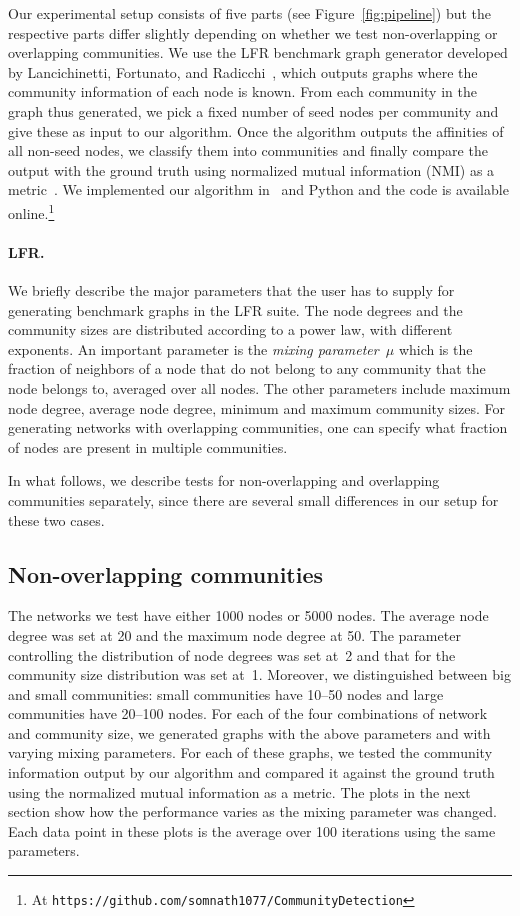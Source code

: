 Our experimental setup consists of five parts (see Figure~\ref{fig:pipeline})
but the respective parts differ slightly depending on whether we test
non-overlapping or overlapping communities. We use the LFR benchmark graph
generator developed by Lancichinetti, Fortunato, and Radicchi~\cite{LFR08,LF09},
which outputs graphs where the community information of each node is known. From
each community in the graph thus generated, we pick a fixed number of seed nodes
per community and give these as input to our algorithm.  Once the algorithm
outputs the affinities of all non-seed nodes, we classify them into communities
and finally compare the output with the ground truth using normalized mutual
information (NMI) as a metric~\cite{DDDA05}. We implemented our algorithm in
\CPP\ and Python and the code is available online.\footnote{At
\texttt{https://github.com/somnath1077/CommunityDetection}}


\paragraph{LFR.}
We briefly describe the major parameters that the user has to supply for
generating benchmark graphs in the LFR suite. The node degrees and the community
sizes are distributed according to a power law, with different exponents.  An
important parameter is the \emph{mixing parameter~$\mu$} which is the fraction
of neighbors of a node that do not belong to any community that the node belongs
to, averaged over all nodes.  The other parameters include maximum node degree,
average node degree, minimum and maximum community sizes. For generating
networks with overlapping communities, one can specify what fraction of nodes
are present in multiple communities.


In what follows, we describe tests for non-overlapping and overlapping
communities separately, since there are several small differences in our setup
for these two cases. 

\subsection{Non-overlapping communities}
The networks we test have either 1000 nodes or 5000 nodes. The average node
degree was set at 20 and the maximum node degree at 50. The parameter
controlling the distribution of node degrees was set at~2 and that for the
community size distribution was set at~1. Moreover, we distinguished between big
and small communities: small communities have 10--50 nodes and large communities
have 20--100 nodes.  For each of the four combinations of network and community
size, we generated graphs with the above parameters and with varying mixing
parameters. For each of these graphs, we tested the community information output
by our algorithm and compared it against the ground truth using the normalized
mutual information as a metric. The plots in the next section show how the
performance varies as the mixing parameter was changed. Each data point in these
plots is the average over 100 iterations using the same parameters. 

